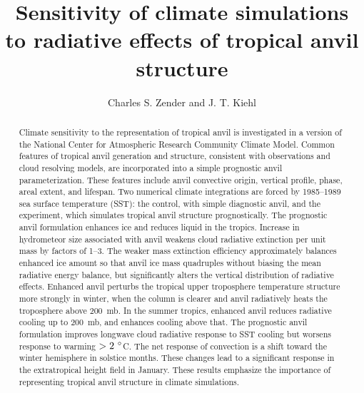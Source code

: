 \documentclass[twoside,agupp]{aguplus}
\begin{document}

\def\paperchaptertitle{Sensitivity of climate simulations to
radiative effects of tropical anvil structure}   
\title{\paperchaptertitle}
\author{Charles S. Zender and J. T. Kiehl}

\begin{abstract}

Climate sensitivity to the representation of tropical anvil is
investigated in a version of the National Center for Atmospheric
Research Community Climate Model.
Common features of tropical anvil generation and structure, consistent
with observations and cloud resolving models, are incorporated into a
simple prognostic anvil parameterization. 
These features include anvil convective origin, vertical profile,
phase, areal extent, and lifespan.  
Two numerical climate integrations are forced by 1985--1989 sea
surface temperature (SST):
the control, with simple diagnostic anvil, and the experiment, which  
simulates tropical anvil structure prognostically.
The prognostic anvil formulation enhances ice and reduces liquid in
the tropics.    
Increase in hydrometeor size associated with anvil weakens cloud
radiative extinction per unit mass by factors of 1--3.
The weaker mass extinction efficiency approximately balances enhanced
ice amount so that anvil ice mass quadruples without biasing the mean
radiative energy balance, but significantly alters the vertical
distribution of radiative effects.
Enhanced anvil perturbs the tropical upper troposphere temperature
structure more strongly in winter, when the column is clearer and
anvil radiatively heats the troposphere above 200~mb. 
In the summer tropics, enhanced anvil reduces radiative cooling up to 
200~mb, and enhances cooling above that.
The prognostic anvil formulation improves longwave cloud radiative
response to SST cooling but worsens response to warming $> 2\
^{\circ}$C.  
The net response of convection is a shift toward the winter hemisphere
in solstice months.
These changes lead to a significant response in the extratropical
height field in January. 
These results emphasize the importance of representing tropical anvil
structure in climate simulations.
\end{abstract}
\end{document}
